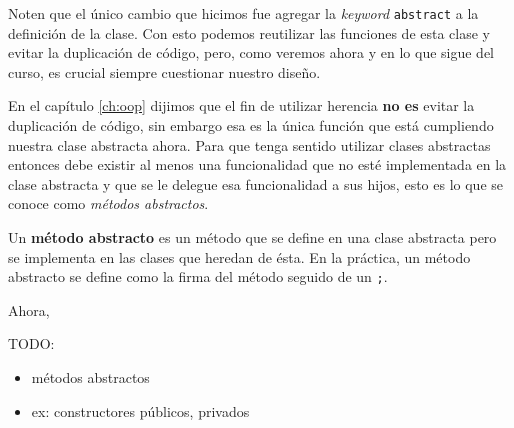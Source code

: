   Noten que el único cambio que hicimos fue agregar la \textit{keyword} \texttt{abstract}
  a la definición de la clase.
  Con esto podemos reutilizar las funciones de esta clase y evitar la duplicación de código, pero,
  como veremos ahora y en lo que sigue del curso, es crucial siempre cuestionar nuestro diseño.

  En el capítulo \ref{ch:oop} dijimos que el fin de utilizar herencia \textbf{no es} evitar la 
  duplicación de código, sin embargo esa es la única función que está cumpliendo nuestra clase 
  abstracta ahora.
  Para que tenga sentido utilizar clases abstractas entonces debe existir al menos una funcionalidad
  que no esté implementada en la clase abstracta y que se le delegue esa funcionalidad a sus hijos,
  esto es lo que se conoce como \textit{métodos abstractos}.

  Un \textbf{método abstracto} es un método que se define en una clase abstracta pero se implementa
  en las clases que heredan de ésta.
  En la práctica, un método abstracto se define como la firma del método seguido de un \texttt{;}.

  Ahora, 

  TODO:
  \begin{itemize}
    \item métodos abstractos
    \item ex: constructores públicos, privados
  \end{itemize}
%